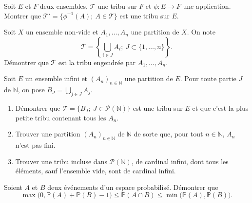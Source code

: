 \documentclass[../PolyS4.tex]{subfiles}
\begin{document}





Soit $E$ et $F$ deux ensembles, $\mathcal T$ une tribu sur $F$ et $\phi:E\to F$ une application. Montrer que $\mathcal T'=\{\phi^{-1}(A);\ A\in\mathcal T\}$ est une tribu sur $E$.\\







Soit $X$ un ensemble non-vide et $A_1,\dots,A_n$ une partition de $X$.
On note 
$$\mathcal T=\left\{\bigcup_{i\in J}A_i;\ J\subset\{1,\dots,n\}\right\}.$$
Démontrer que $\mathcal T$ est la tribu engendrée par $A_1,\dots,A_n$.\\





Soit $E$ un ensemble infini et $(A_n)_{n\in\mathbb N}$ une partition de $E$. Pour toute partie $J$ de $\mathbb N$, on pose $B_J=\bigcup_{j\in J}A_j$. 
\begin{enumerate}
\item Démontrer que $\mathcal T=\{B_J;\ J\in\mathcal P(\mathbb N)\}$ est une tribu sur $E$ et que c'est la plus petite tribu contenant tous les $A_n$.
\item Trouver une partition $(A_n)_{n\in\mathbb N}$ de $\mathbb N$ de sorte que, pour tout $n\in\mathbb N$, $A_n$ n'est pas fini.
\item Trouver une tribu incluse dans $\mathcal P(\mathbb N)$, de cardinal infini, dont tous les éléments, sauf l'ensemble vide, sont de cardinal infini.\\
\end{enumerate}






Soient $A$ et $B$ deux événements d'un espace probabilisé. Démontrer que 
$$\max\big(0,\mathbb{P}(A)+\mathbb{P}(B)-1\big)\leq \mathbb{P}(A\cap B)\leq \min\big(\mathbb{P}(A),\mathbb{P}(B)\big).$$





\end{document}
